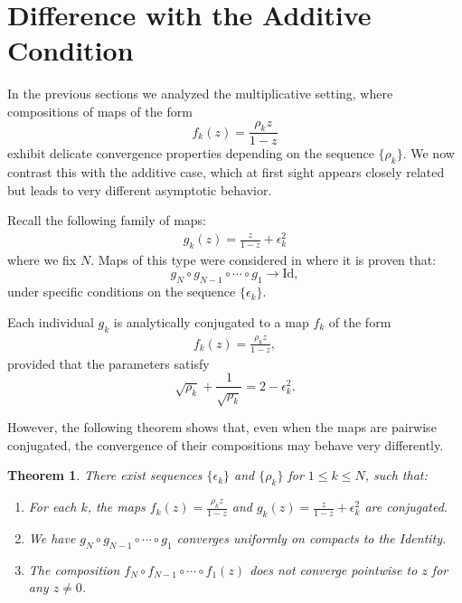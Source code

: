 \documentclass{amsart}
\newtheorem{mainthm}{Theorem}
\theoremstyle{remark}
\theoremstyle{definition}
\begin{document}
\section{Difference with the Additive Condition}\label{sec:differencewiththeadditive}

In the previous sections we analyzed the multiplicative setting, where compositions of maps of the form 
\[
f_k(z) = \frac{\rho_k z}{1-z}
\]
exhibit delicate convergence properties depending on the sequence $\{\rho_k\}$. 
We now contrast this with the additive case, which at first sight appears closely related but leads to very different asymptotic behavior.

Recall the following family of maps:
\begin{align*}
g_k(z)=\frac{z}{1-z}+\epsilon_k^2
\end{align*}
where we fix $N$.
Maps of this type were considered in \cite{Viv20} where it is proven that:
\[
g_N \circ g_{N-1} \circ \cdots \circ g_1 \to \mathrm{Id},
\]
under specific conditions on the sequence $\{\epsilon_k\}$.

Each individual $g_k$ is analytically conjugated to a map $f_k$ of the form
\begin{align*}
f_k(z) = \frac{\rho_k z}{1-z},
\end{align*}
provided that the parameters satisfy
\begin{equation*}
\sqrt{\rho_k} + \frac{1}{\sqrt{\rho_k}} = 2 - \epsilon_k^2.
\end{equation*}

However, the following theorem shows that, even when the maps are pairwise conjugated, the convergence of their compositions may behave very differently.

\begin{mainthm}

There exist sequences $\{\epsilon_k\}$ and $\{\rho_k\}$ for $1\leq k\leq N$, such that:
\begin{enumerate}
\item For each $k$, the maps $\displaystyle{f_k(z)=\frac{\rho_k z}{1-z}}$ and $\displaystyle{g_k(z)=\frac{z}{1-z}+\epsilon_k^2}$ are conjugated.\label{part1:thmC}
\item We have $g_N \circ g_{N-1} \circ\cdots \circ g_1$ converges uniformly on compacts to the Identity.\label{part2:thmC}
\item The composition $f_N \circ f_{N-1}\circ\cdots \circ f_1(z)$ does not converge pointwise to $z$ for any $z \neq 0$.\label{part3:thmC}
\end{enumerate}
\end{mainthm}
\end{document}
